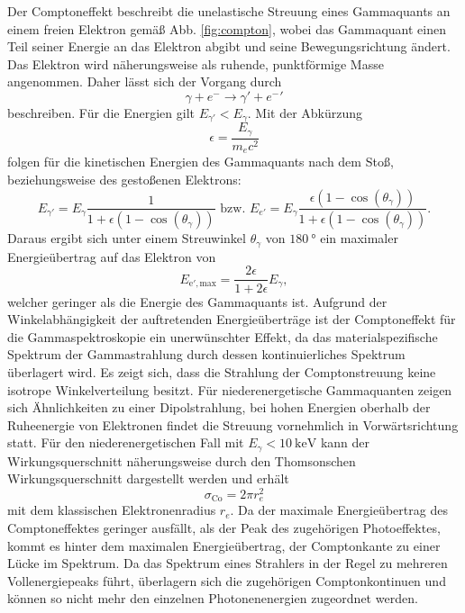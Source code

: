 Der Comptoneffekt beschreibt die unelastische Streuung eines Gammaquants an einem freien Elektron gemäß Abb. \ref{fig:compton}, wobei das Gammaquant einen Teil seiner Energie an das Elektron abgibt und seine Bewegungsrichtung ändert. Das Elektron wird näherungsweise als ruhende, punktförmige Masse angenommen. Daher lässt sich der Vorgang durch
\begin{equation}
    \gamma + e^- \to \gamma' + {e^{-}}'
\end{equation}
beschreiben. Für die Energien gilt $E_{\gamma'} < E_\gamma$.
Mit der Abkürzung
\begin{equation}
    \epsilon = \frac{E_\gamma}{m_e c^2} \label{eq:eps}
\end{equation}
folgen für die kinetischen Energien des Gammaquants nach dem Stoß, beziehungsweise des gestoßenen Elektrons:
\begin{equation}
    E_{\gamma'} =  E_\gamma \frac{1}{1+ \epsilon (1-\cos(\theta_\gamma))} \text{ bzw. } E_{e'} =  E_\gamma \frac{\epsilon (1-\cos(\theta_\gamma))}{1+ \epsilon (1-\cos(\theta_\gamma))} . \label{eq:ecomp}
\end{equation}
Daraus ergibt sich unter einem Streuwinkel $\theta_\gamma$ von $\SI{180}{\degree}$ ein maximaler Energieübertrag auf das Elektron von
\begin{equation}
    E_{\text{e}',\text{max}} = \frac{2 \epsilon}{1 + 2 \epsilon} E_\gamma , \label{eq:emaxcomp}
\end{equation}
welcher geringer als die Energie des Gammaquants ist. %
Aufgrund der Winkelabhängigkeit der auftretenden Energieüberträge ist der Comptoneffekt für die Gammaspektroskopie ein unerwünschter Effekt, da das materialspezifische Spektrum der Gammastrahlung durch dessen kontinuierliches Spektrum überlagert wird.
 Es zeigt sich, dass die Strahlung der Comptonstreuung keine isotrope Winkelverteilung besitzt. Für niederenergetische Gammaquanten zeigen sich Ähnlichkeiten zu einer Dipolstrahlung, bei hohen Energien oberhalb der Ruheenergie von Elektronen findet die Streuung vornehmlich in Vorwärtsrichtung statt. Für den niederenergetischen Fall mit $E_\gamma < \SI{10}{\kilo\electronvolt}$ kann der Wirkungsquerschnitt näherungsweise durch den Thomsonschen Wirkungsquerschnitt dargestellt werden und erhält
\begin{equation}
    \sigma_\text{Co} = 2 \pi r_e^2
\end{equation}
mit dem klassischen Elektronenradius $r_e$. Da der maximale Energieübertrag des Comptoneffektes geringer ausfällt, als der Peak des zugehörigen Photoeffektes, kommt es hinter dem maximalen Energieübertrag, der Comptonkante zu einer Lücke im Spektrum. Da das Spektrum eines Strahlers in der Regel zu mehreren Vollenergiepeaks führt, überlagern sich die zugehörigen Comptonkontinuen und können so nicht mehr den einzelnen Photonenenergien zugeordnet werden.

